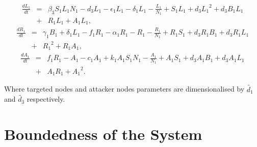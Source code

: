 \begin{eqnarray}
\frac{dL_1}{dt}&=&\beta_3S_1L_1N_1-d_3L_1-\epsilon_1L_1-\delta_1L_1-\frac{L_1}{N_1}+S_1L_1+d_3{L_1}^2+d_3B_1L_1 \nonumber \\
   &+&R_1L_1+A_1L_1,
\end{eqnarray}
\begin{eqnarray}
\frac{dR_1}{dt}&=&\gamma_1B_1+\delta_1L_1-f_1R_1-\alpha_1R_1-R_1-\frac{R_1}{N_1}+R_1S_1+d_3R_1B_1+d_3R_1L_1 \nonumber \\
   &+&{R_1}^2+R_1A_1,
\end{eqnarray}
\begin{eqnarray}
\frac{dA_1}{dt}&=&f_1R_1-A_1-c_1A_1+k_1A_1S_1N_1-\frac{A_1}{N_1}+A_1S_1+d_3A_1B_1+d_3A_1L_1 \nonumber \\
   &+&A_1R_1+{A_1}^2.
\end{eqnarray}

\noindent Where targeted nodes and attacker nodes parameters are dimensionalised by $\tilde{d_1}$ and $\tilde{d_3}$ respectively.


\section{Boundedness of the System}

